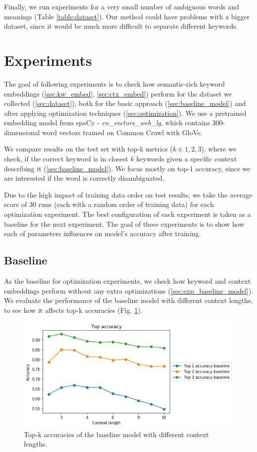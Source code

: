 \documentclass{llncs}
\begin{document}
Finally, we run experiments for a very small number of ambiguous words and meanings (Table \ref{table:dataset}). Our method could have problems with a bigger dataset, since it would be much more difficult to separate different keywords.


\section{Experiments}
\label{sec:experiments}
The goal of following experiments is to check how semantic-rich keyword embeddings (\ref{sec:kw_embed}, \ref{sec:ctx_embed}) perform for the dataset we collected (\ref{sec:dataset}), both for the basic approach (\ref{sec:baseline_model}) and after applying optimization techniques (\ref{sec:optimization}).
We use a pretrained embedding model from spaCy - \textit{en\_vectors\_web\_lg}, which contains 300-dimensional word vectors trained on Common Crawl with GloVe\cite{spacymodel}.

We compare results on the test set with top-k metrics (\(k \in {1, 2, 3}\)), where we check, if the correct keyword is in closest \(k\) keywords given a specific context describing it (\ref{sec:baseline_model}). We focus mostly on top-1 accuracy, since we are interested if the word is correctly disambiguated.

Due to the high impact of training data order on test results, we take the average score of 30 runs (each with a random order of training data) for each optimization experiment.
The best configuration of each experiment is taken as a baseline for the next experiment.
The goal of these experiments is to show how each of parameters influences on model's accuracy after training.

\subsection{Baseline}
\label{sec:exp_baseline}
As the baseline for optimization experiments, we check how keyword and context embeddings perform without any extra optimizations (\ref{sec:exp_baseline_model}).
We evaluate the performance of the baseline model with different context lengths, to see how it affects top-k accuracies (Fig. \ref{fig:baseline}).

\begin{figure}
    \centering
    \caption{Top-k accuracies of the baseline model with different context lengths.}
    \label{fig:baseline}
    \includegraphics[scale=0.7]{res/baseline_context_top_acc.png}
\end{figure}
\end{document}
